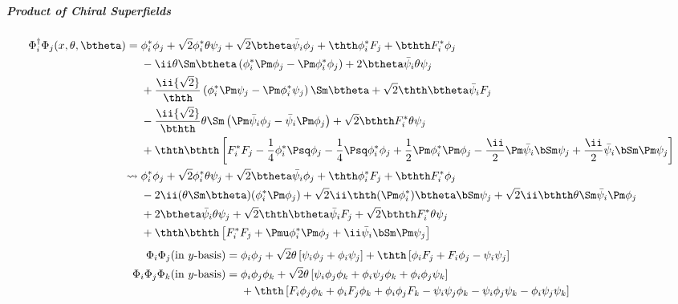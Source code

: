 \subparagraph{Product of Chiral Superfields}
\begin{align}
\Phi^\dagger_i\Phi_j(x,\theta,\btheta)
={}& \phi^*_i\phi_j
       + \sqrt2\phi^*_i\theta\psi_j + \sqrt2\btheta\bar\psi_i\phi_j
       + \thth \phi^*_iF_j + \bthth F^*_i\phi_j\notag\\
   & - \ii\theta\Sm\btheta\left(\phi^*_i\Pm\phi_j-\Pm\phi^*_i\phi_j\right)
       + 2\btheta\bar\psi_i\theta\psi_j\notag\\
   & + \frac\ii{\sqrt2}\thth
         \left(\phi^*_i\Pm\psi_j-\Pm\phi^*_i\psi_j\right)\Sm\btheta
       + \sqrt2\thth \btheta\bar\psi_i F_j\notag\\
   & - \frac\ii{\sqrt2}\bthth\theta\Sm
         \left(\Pm\bar\psi_i\phi_j-\bar\psi_i\Pm\phi_j\right)
       + \sqrt2\bthth F^*_i\theta\psi_j\\
   & + \thth\bthth\left[
        F^*_iF_j-\frac14\phi^*_i\Psq\phi_j-\frac14\Psq\phi^*_i\phi_j
        +\frac12\Pm\phi^*_i\Pm\phi_j
        - \frac\ii2\Pm\bar\psi_i\bSm\psi_j
        + \frac\ii2\bar\psi_i\bSm\Pm\psi_j\right]\notag\\
\leadsto{}
   & \phi^*_i\phi_j
       + \sqrt2\phi^*_i\theta\psi_j + \sqrt2\btheta\bar\psi_i\phi_j
       + \thth \phi^*_iF_j + \bthth F^*_i\phi_j\notag\\
   & - 2\ii(\theta\Sm\btheta)(\phi^*_i\Pm\phi_j)
       + \sqrt2\ii\thth(\Pm\phi^*_i)\btheta\bSm\psi_j
       + \sqrt2\ii\bthth\theta\Sm\bar\psi_i\Pm\phi_j\\
   & + 2\btheta\bar\psi_i\theta\psi_j
       + \sqrt2\thth \btheta\bar\psi_i F_j
       + \sqrt2\bthth F^*_i\theta\psi_j\notag\\
   & + \thth\bthth\left[
        F^*_iF_j + \Pmu\phi^*_i\Pm\phi_j + \ii\bar\psi_i\bSm\Pm\psi_j\right]\notag
\end{align}\vspace{-2zw}
\begin{align}
\Phi_i\Phi_j\text{(in $y$-basis)}
={}& \phi_i\phi_j+\sqrt2\theta\left[\psi_i\phi_j+\phi_i\psi_j\right]
     +\thth\left[\phi_iF_j+F_i\phi_j-\psi_i\psi_j\right]\\
\Phi_i\Phi_j\Phi_k\text{(in $y$-basis)}
={}& \phi_i\phi_j\phi_k
     + \sqrt2\theta\left[\psi_i\phi_j\phi_k
                        +\phi_i\psi_j\phi_k
                        +\phi_i\phi_j\psi_k\right]\notag\\
   & +\thth\left[
      F_i\phi_j\phi_k+\phi_iF_j\phi_k+\phi_i\phi_jF_k
      -\psi_i\psi_j\phi_k-\psi_i\phi_j\psi_k
      -\phi_i\psi_j\psi_k
      \right]
\end{align}\vspace{-3zw}\par
